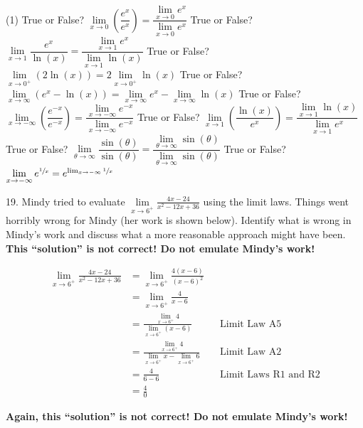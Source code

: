 \documentclass[12pt,]{book}
\theoremstyle{plain}
\theoremstyle{definition}
\numberwithin{equation}{section}
\newcommand{\fe}[2]{#1\mathopen{}\left(#2\right)\mathclose{}}
\begin{document}
\begin{exerciselist}
\par
\begin{exercisegroup}(1)
\exercise[11.]\hypertarget{exercise-hear-me-first}{\null}True or False? \(\lim\limits_{x\to0}\left(\dfrac{e^x}{e^x}\right)=\dfrac{\lim\limits_{x\to0}e^x}{\lim\limits_{x\to0}e^x}\)%
\exercise[12.]\hypertarget{exercise-101}{\null}True or False? \(\lim\limits_{x\to1}\dfrac{e^x}{\fe{\ln}{x}}=\dfrac{\lim\limits_{x\to1}e^x}{\lim\limits_{x\to1}\fe{\ln}{x}}\)%
\exercise[13.]\hypertarget{exercise-102}{\null}True or False? \(\lim\limits_{x\to0^{+}}\left(2\fe{\ln}{x}\right)=2\lim\limits_{x\to0^{+}}\fe{\ln}{x}\)%
\exercise[14.]\hypertarget{exercise-103}{\null}True or False? \(\lim\limits_{x\to\infty}\left(e^x-\fe{\ln}{x}\right)=\lim\limits_{x\to\infty}e^x-\lim\limits_{x\to\infty}\fe{\ln}{x}\)%
\exercise[15.]\hypertarget{exercise-104}{\null}True or False? \(\lim\limits_{x\to-\infty}\left(\dfrac{e^{-x}}{e^{-x}}\right)=\dfrac{\lim\limits_{x\to-\infty}e^{-x}}{\lim\limits_{x\to-\infty}e^{-x}}\)%
\exercise[16.]\hypertarget{exercise-105}{\null}True or False? \(\lim\limits_{x\to1}\left(\dfrac{\fe{\ln}{x}}{e^x}\right)=\dfrac{\lim\limits_{x\to1}\fe{\ln}{x}}{\lim\limits_{x\to1}e^x}\)%
\exercise[17.]\hypertarget{exercise-106}{\null}True or False? \(\lim\limits_{\theta\to\infty}\dfrac{\fe{\sin}{\theta}}{\fe{\sin}{\theta}}=\dfrac{\lim\limits_{\theta\to\infty}\fe{\sin}{\theta}}{\lim\limits_{\theta\to\infty}\fe{\sin}{\theta}}\)%
\exercise[18.]\hypertarget{exercise-hear-me-last}{\null}True or False? \(\lim\limits_{x\to-\infty}e^{\sfrac{1}{x}}=e^{\lim_{x\to-\infty}\sfrac{1}{x}}\)%
\end{exercisegroup}
\par\smallskip\noindent
\item[19.]\hypertarget{exercise-108}{\null}Mindy tried to evaluate \(\lim\limits_{x\to6^{+}}\frac{4x-24}{x^2-12x+36}\) using the limit laws. Things went horribly wrong for Mindy (her work is shown below). Identify what is wrong in Mindy's work and discuss what a more reasonable approach might have been. \textbf{This ``solution'' is not correct! Do not emulate Mindy's work!}%
\par
\begin{align*}
\lim_{x\to6^{+}}\frac{4x-24}{x^2-12x+36}&=\lim_{x\to6^{+}}\frac{4(x-6)}{(x-6)^2}\\
&=\lim_{x\to6^{+}}\frac{4}{x-6}\\
&=\frac{\lim\limits_{x\to6^{+}}4}{\lim\limits_{x\to6^{+}}(x-6)}&&\text{Limit Law A5}\\
&=\frac{\lim\limits_{x\to6^{+}}4}{\lim\limits_{x\to6^{+}}x-\lim\limits_{x\to6^{+}}6}&&\text{Limit Law A2}\\
&=\frac{4}{6-6}&&\text{Limit Laws R1 and R2}\\
&=\frac{4}{0}
\end{align*}%
\par
\textbf{Again, this ``solution'' is not correct! Do not emulate Mindy's work!}%
\par\smallskip
\end{exerciselist}
\typeout{************************************************}
\typeout{************************************************}
\end{document}
